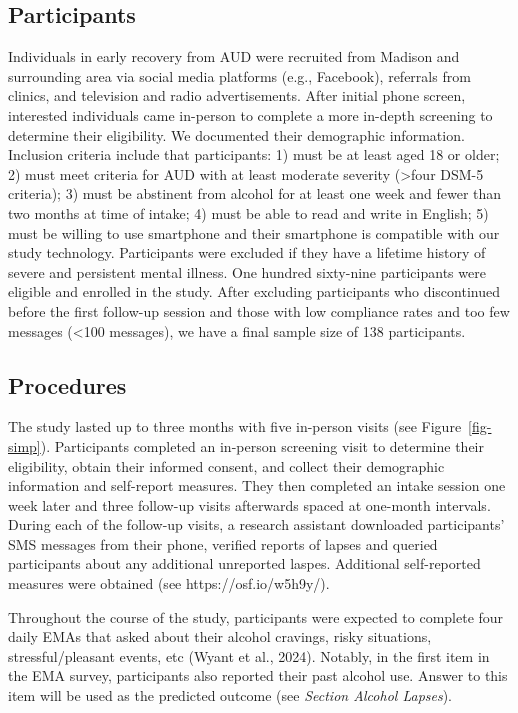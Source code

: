 \documentclass[
  letterpaper,
  DIV=11,
  numbers=noendperiod]{scrartcl}
\begin{document}
\subsection{Participants}\label{participants}

Individuals in early recovery from AUD were recruited from Madison and
surrounding area via social media platforms (e.g., Facebook), referrals
from clinics, and television and radio advertisements. After initial
phone screen, interested individuals came in-person to complete a more
in-depth screening to determine their eligibility. We documented their
demographic information. Inclusion criteria include that participants:
1) must be at least aged 18 or older; 2) must meet criteria for AUD with
at least moderate severity (\textgreater four DSM-5 criteria); 3) must
be abstinent from alcohol for at least one week and fewer than two
months at time of intake; 4) must be able to read and write in English;
5) must be willing to use smartphone and their smartphone is compatible
with our study technology. Participants were excluded if they have a
lifetime history of severe and persistent mental illness. One hundred
sixty-nine participants were eligible and enrolled in the study. After
excluding participants who discontinued before the first follow-up
session and those with low compliance rates and too few messages
(\textless100 messages), we have a final sample size of 138
participants.

\subsection{Procedures}\label{procedures}

The study lasted up to three months with five in-person visits (see
Figure~\ref{fig-simp}). Participants completed an in-person screening
visit to determine their eligibility, obtain their informed consent, and
collect their demographic information and self-report measures. They
then completed an intake session one week later and three follow-up
visits afterwards spaced at one-month intervals. During each of the
follow-up visits, a research assistant downloaded participants' SMS
messages from their phone, verified reports of lapses and queried
participants about any additional unreported laspes. Additional
self-reported measures were obtained (see https://osf.io/w5h9y/).

Throughout the course of the study, participants were expected to
complete four daily EMAs that asked about their alcohol cravings, risky
situations, stressful/pleasant events, etc (Wyant et al., 2024).
Notably, in the first item in the EMA survey, participants also reported
their past alcohol use. Answer to this item will be used as the
predicted outcome (see \emph{Section Alcohol Lapses}).
\end{document}
